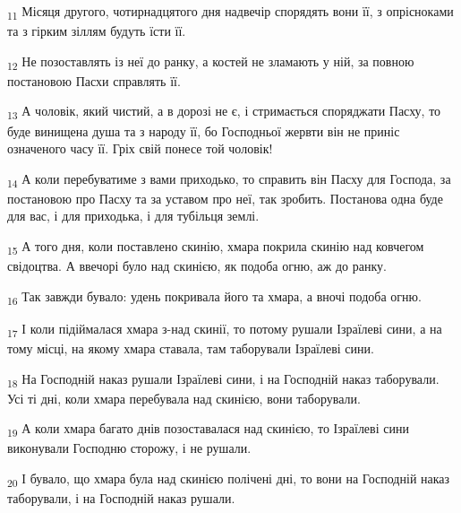 \begin{tcolorbox}
\textsubscript{11} Місяця другого, чотирнадцятого дня надвечір спорядять вони її, з опрісноками та з гірким зіллям будуть їсти її.
\end{tcolorbox}
\begin{tcolorbox}
\textsubscript{12} Не позоставлять із неї до ранку, а костей не зламають у ній, за повною постановою Пасхи справлять її.
\end{tcolorbox}
\begin{tcolorbox}
\textsubscript{13} А чоловік, який чистий, а в дорозі не є, і стримається споряджати Пасху, то буде винищена душа та з народу її, бо Господньої жервти він не приніс означеного часу її. Гріх свій понесе той чоловік!
\end{tcolorbox}
\begin{tcolorbox}
\textsubscript{14} А коли перебуватиме з вами приходько, то справить він Пасху для Господа, за постановою про Пасху та за уставом про неї, так зробить. Постанова одна буде для вас, і для приходька, і для тубільця землі.
\end{tcolorbox}
\begin{tcolorbox}
\textsubscript{15} А того дня, коли поставлено скинію, хмара покрила скинію над ковчегом свідоцтва. А ввечорі було над скинією, як подоба огню, аж до ранку.
\end{tcolorbox}
\begin{tcolorbox}
\textsubscript{16} Так завжди бувало: удень покривала його та хмара, а вночі подоба огню.
\end{tcolorbox}
\begin{tcolorbox}
\textsubscript{17} І коли підіймалася хмара з-над скинії, то потому рушали Ізраїлеві сини, а на тому місці, на якому хмара ставала, там таборували Ізраїлеві сини.
\end{tcolorbox}
\begin{tcolorbox}
\textsubscript{18} На Господній наказ рушали Ізраїлеві сини, і на Господній наказ таборували. Усі ті дні, коли хмара перебувала над скинією, вони таборували.
\end{tcolorbox}
\begin{tcolorbox}
\textsubscript{19} А коли хмара багато днів позоставалася над скинією, то Ізраїлеві сини виконували Господню сторожу, і не рушали.
\end{tcolorbox}
\begin{tcolorbox}
\textsubscript{20} І бувало, що хмара була над скинією полічені дні, то вони на Господній наказ таборували, і на Господній наказ рушали.
\end{tcolorbox}
